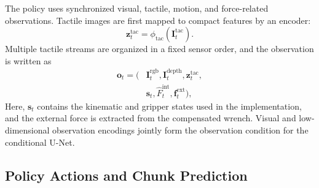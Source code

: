 The policy uses synchronized visual, tactile, motion, and force-related observations.
Tactile images are first mapped to compact features by an encoder:
\begin{equation}
    \mathbf{z}_t^{\mathrm{tac}}
    =\phi_{\mathrm{tac}}\left(\mathbf{I}_t^{\mathrm{tac}}\right).
    \label{eq:tactile_features}
\end{equation}
Multiple tactile streams are organized in a fixed sensor order, and the observation is written as
\begin{equation}
\begin{aligned}
    \mathbf{o}_t=\big(&\mathbf{I}_t^{\mathrm{rgb}},
    \mathbf{I}_t^{\mathrm{depth}},\mathbf{z}_t^{\mathrm{tac}},\\
    &\mathbf{s}_t,\widehat{F}_t^{\mathrm{int}},
    \mathbf{f}_t^{\mathrm{ext}}\big),
    \label{eq:policy_observation}
\end{aligned}
\end{equation}
Here, $\mathbf{s}_t$ contains the kinematic and gripper states used in the implementation, and the external force is extracted from the compensated wrench.
Visual and low-dimensional observation encodings jointly form the observation condition for the conditional U-Net.

\subsection{Policy Actions and Chunk Prediction}

